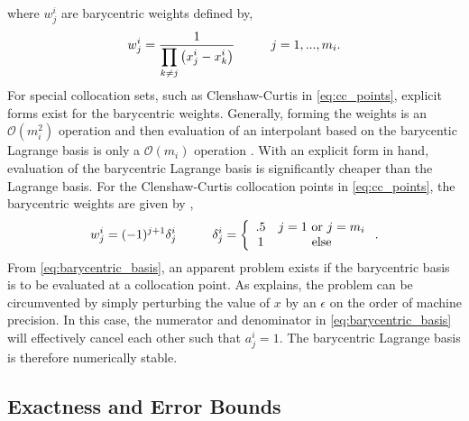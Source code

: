 where $w_j^i$ are barycentric weights defined by,
\begin{equation} \label{eq:barycentric_weights}
    w_j^i = \frac{1}
     {\displaystyle \prod_{k \neq j}\left(x_j^i - x_k^i\right)}
      \hspace{1 cm} j=1,...,m_i.
\end{equation}
For special collocation sets, such as Clenshaw-Curtis in \ref{eq:cc_points}, explicit forms exist for the barycentric weights. Generally, forming the weights is an $\mathcal{O}(m_i^2)$ operation and then evaluation of an interpolant based on the barycentic Lagrange basis is only a $\mathcal{O}(m_i)$ operation \cite{BaryCentIntrp}. With an explicit form in hand, evaluation of the barycentric Lagrange basis is significantly cheaper than the Lagrange basis. For the Clenshaw-Curtis collocation points in \ref{eq:cc_points}, the barycentric weights are given by \cite{ChebyType2},
\begin{equation} \label{eq:barycentric_weights4_cc}
    w_j^i = (-1)^{j+1}\delta_j^i \hspace{1 cm}
     \delta_j^i = \left\{
                   \begin{array}{cc}
                    .5   & j=1 \text{ or } j=m_i \\
                    1   & \text{ else }  
				   \end{array}
				  \right. .                   
\end{equation}      
From \ref{eq:barycentric_basis}, an apparent problem exists if the barycentric basis is to be evaluated at a collocation point. As \cite{BaryCentIntrp} explains, the problem can be circumvented by simply perturbing the value of $x$ by an $\epsilon$ on the order of machine precision. In this case, the numerator and denominator in \ref{eq:barycentric_basis} will effectively cancel each other such that $a_j^i=1$. The barycentric Lagrange basis is therefore numerically stable.  

\subsection{Exactness and Error Bounds} \label{subsec:exactness_error}


